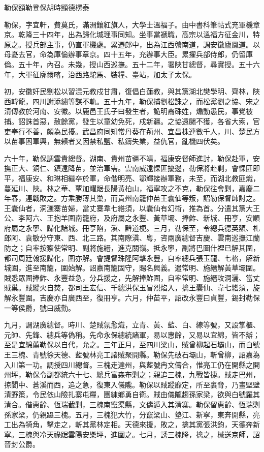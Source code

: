 
\begin{pinyinscope}
勒保額勒登保胡時顯德楞泰

勒保，字宜軒，費莫氏，滿洲鑲紅旗人，大學士溫福子。由中書科筆帖式充軍機章京。乾隆三十四年，出為歸化城理事同知。坐事當褫職，高宗以溫福方征金川，特原之。授兵部主事，仍直軍機處。累遷郎中，出為江西贛南道，調安徽廬鳳道。以母憂去官，命為庫倫辦事章京。四十五年，充辦事大臣。累擢兵部侍郎，仍留庫倫。五十年，內召。未幾，授山西巡撫。五十二年，署陜甘總督，尋實授。五十六年，大軍征廓爾喀，治西路駝馬、裝糧、臺站，加太子太保。

初，安徽奸民劉松以習混元教戍甘肅，復倡白蓮教，與其黨湖北樊學明、齊林，陜西韓龍，四川謝添繡等謀不軌。五十九年，勒保捕劉松誅之，而松黨劉之協、宋之清傳教於河南、安徽。以鹿邑王氏子曰發生者，詭明裔硃姓，煽動愚民，事覺被捕。詔誅首惡，赦餘黨，發生以童幼免死，戍新疆。之協遠颺不獲，各省大索，官吏奉行不善，頗為民擾。武昌府同知常丹葵在荊州、宜昌株連數千人，川、楚民方以苗事困軍興，無賴者又因禁私鹽、私鑄失業，益仇官，亂機四伏矣。

六十年，勒保調雲貴總督。湖南、貴州苗疆不靖，福康安督師進討，勒保赴軍，安撫正大、銅仁、鎮遠降苗，並治軍需。雲南威遠惈匪擾邊，勒保將赴剿，會惈匪即平，福康安、和琳相繼卒於軍，命偕明亮、鄂輝接辦軍務，未至，而湖北教匪熾，蔓延川、陜。林之華、覃加耀踞長陽黃柏山，福寧攻之不克，勒保往會剿，嘉慶二年春，連戰敗之。方乘勝薄其巢，而貴州南籠仲苗王囊仙等叛，詔勒保督師討之。王囊仙者，洞灑寨苗婦，當丈寨韋七綹須，以囊仙有幻術，推為首。分遣其黨大王公、李阿六、王抱羊圍南籠府，及府屬之永豐、黃草壩、捧鮓、新城、冊亨，安順府屬之永寧、歸化諸城。冊亨陷，滇、黔道梗。三月，勒保至，令總兵德英額、札郎阿、袁敏分守東、西、北三路。其南際滇、粵，咨兩廣總督吉慶、雲南巡撫江蘭防之；自率按察使常明、副將施縉，進克關嶺。抵永寧，副將巴圖什裡已解其圍，都司周廷翰援歸化，圍亦解。會提督珠隆阿擊永豐，自率總兵張玉龍、七格，解新城圍，進至南籠，圍始解。詔嘉南籠固守，賜名興義。遣常明、施縉解黃草壩圍。賊悉眾圍捧鮓、永豐益急，分兵援之，先解捧鮓圍，自率常明、施縉攻洞灑、當丈賊巢。賊縱火自焚，都司王宏信、千總洪保玉冒烈焰入，擒王囊仙、韋七綹須，旋解永豐圍。吉慶亦自廣西至，復冊亨。六月，仲苗平，詔改永豐曰貞豐，錫封勒保一等侯爵，號曰威勤。

九月，調湖廣總督。時川、楚賊氛愈熾，立青、黃、藍、白、線等號，又設掌櫃、元帥、先鋒、總兵等偽稱。先命永保總統諸軍，易以惠齡，又易以宜綿，皆不辦；至是宜綿薦勒保以自代，允之。三年正月，至四川梁山，賊曾柳起石壩山，而白號王三槐、青號徐天德、藍號林亮工諸賊聚開縣。勒保先破石壩山，斬曾柳，詔嘉為入川第一功。調授四川總督。三槐走達州，與藍號冉文儔合，惟亮工仍在開縣之開州坪，勒保令副都統六十七、總兵富森布剿之；親追三槐，九戰皆捷。賊走巴州，掠閬中、蒼溪而西，追之急，復東入儀隴。勒保以賊蹤靡定，所至裹脅，乃畫堅壁清野策，令民依山險扎寨屯糧，團練鄉勇自衛。賊由儀隴趨孫家梁，欲與白號羅其清合。偕惠齡、恆瑞截剿，三槐南竄渠縣，文儔遁入其清寨。勒保留惠齡、恆瑞剿孫家梁，仍親躡三槐。五月，三槐犯大竹，分竄梁山、墊江、新寧，東奔開縣，亮工出為犄角，擊走之，斬其黨林定相。天德來援，敗之，擒其黨張洪鈞，天德奔新寧。三槐與冷天祿踞雲陽安樂坪，進圍之。七月，誘三槐降，擒之，械送京師，詔晉封公爵。


\end{pinyinscope}
